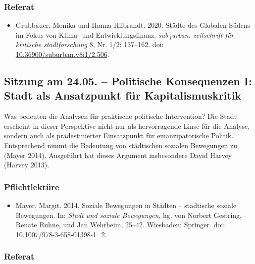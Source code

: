 \documentclass[
]{article}
\providecommand{\tightlist}{%
  \setlength{\itemsep}{0pt}\setlength{\parskip}{0pt}}
\begin{document}
\hypertarget{referat-3}{%
\subsubsection*{Referat}\label{referat-3}}

\begin{itemize}
\tightlist
\item
  Grubbauer, Monika und Hanna Hilbrandt. 2020. Städte des Globalen Südens im Fokus von Klima- und Entwicklungsfinanz. \emph{sub\textbackslash urban. zeitschrift für kritische stadtforschung} 8, Nr. 1/2: 137--162. doi: \href{https://doi.org/10.36900/suburban.v8i1/2.506}{10.36900/suburban.v8i1/2.506}.
\end{itemize}

\hypertarget{sitzung-am-24.05.-politische-konsequenzen-i-stadt-als-ansatzpunkt-fuxfcr-kapitalismuskritik}{%
\subsection{Sitzung am 24.05. -- Politische Konsequenzen I: Stadt als Ansatzpunkt für Kapitalismuskritik}\label{sitzung-am-24.05.-politische-konsequenzen-i-stadt-als-ansatzpunkt-fuxfcr-kapitalismuskritik}}

Was bedeuten die Analysen für praktische politische Intervention? Die Stadt erscheint in dieser Perspektive nicht nur als hervorragende Linse für die Analyse, sondern auch als prädestinierter Einsatzpunkt für emanzipatorische Politik. Entsprechend nimmt die Bedeutung von städtischen sozialen Bewegungen zu (Mayer 2014). Ausgeführt hat dieses Argument insbesondere David Harvey (Harvey 2013).

\hypertarget{pflichtlektuxfcre-4}{%
\subsubsection*{Pflichtlektüre}\label{pflichtlektuxfcre-4}}

\begin{itemize}
\tightlist
\item
  Mayer, Margit. 2014. Soziale Bewegungen in Städten -- städtische soziale Bewegungen. In: \emph{Stadt und soziale Bewegungen}, hg. von Norbert Gestring, Renate Ruhne, und Jan Wehrheim, 25--42. Wiesbaden: Springer. doi: \href{https://doi.org/10.1007/978-3-658-01398-1_2}{10.1007/978-3-658-01398-1\_2}.
\end{itemize}

\hypertarget{referat-4}{%
\subsubsection*{Referat}\label{referat-4}}
\end{document}

